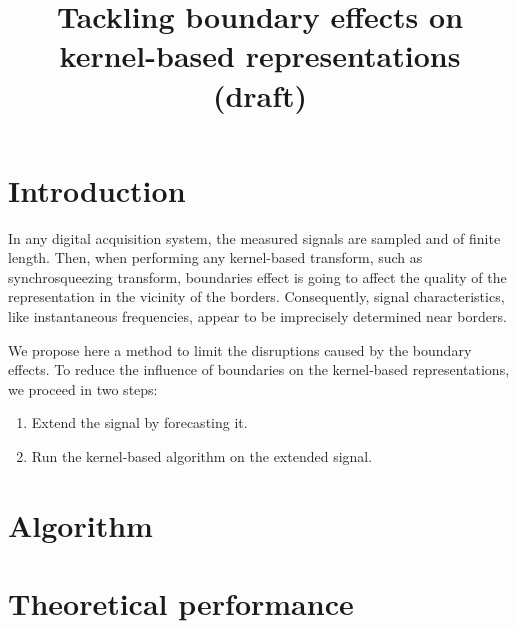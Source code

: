 \documentclass[twoside,letterpaper]{article}
\title{Tackling boundary effects on kernel-based representations (draft)}
\date{}
\begin{document}
\maketitle

\section{Introduction}
In any digital acquisition system, the measured signals are sampled and of finite length. Then, when performing any kernel-based transform, such as synchrosqueezing transform, boundaries effect is going to affect the quality of the representation in the vicinity of the borders. Consequently, signal characteristics, like instantaneous frequencies, appear to be imprecisely determined near borders.

We propose here a method to limit the disruptions caused by the boundary effects. To reduce the influence of boundaries on the kernel-based representations, we proceed in two steps:
\begin{enumerate}
\item Extend the signal by forecasting it.
\item Run the kernel-based algorithm on the extended signal.
\end{enumerate}

\section{Algorithm}



\section{Theoretical performance}


%
\end{document}

